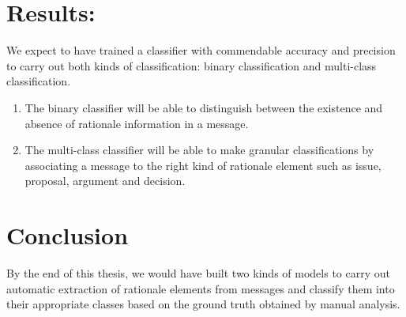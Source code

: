 \documentclass[dvips,12pt]{article}
\begin{document}
\section{Results:}

We expect to have trained a classifier with commendable accuracy and precision to carry out both kinds of classification: binary classification and multi-class classification. 

\begin{enumerate}
	\item The binary classifier will be able to distinguish between the existence and absence of rationale information in a message.
	
	\item The multi-class classifier will be able to make granular classifications by associating a message to the right kind of rationale element such as issue, proposal, argument and decision.
\end{enumerate}

\section{Conclusion}
By the end of this thesis, we would have built two kinds of models to carry out automatic extraction of rationale elements from messages and classify them into their appropriate classes based on the ground truth obtained by manual analysis. 
\end{document}
